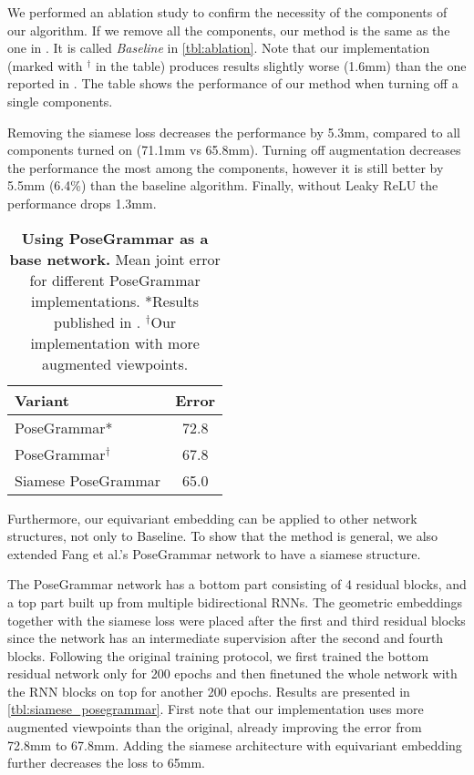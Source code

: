 \documentclass[preprint]{elsarticle}
\begin{document}
We performed an ablation study to confirm the necessity of the components of our algorithm. If we remove all the components, our method is the same as the one in \cite{3dbaseline}. It is called \textit{Baseline} in \autoref{tbl:ablation}. Note that our implementation (marked with $^\dagger$ in the table) produces results slightly worse (1.6mm) than the one reported in \cite{fang2018posegrammar}. The table shows the performance of our method when turning off a single components.

Removing the siamese loss decreases the performance by 5.3mm, compared to all components turned on (71.1mm vs 65.8mm). 
Turning off augmentation decreases the performance the most among the components, however it is still better by 5.5mm (6.4\%) than the baseline algorithm. Finally, without Leaky ReLU the performance drops 1.3mm.


\begin{table}[ht]
\centering
    \begin{tabular}[t]{lc}
    \hline
    Variant & Error \\
    \hline
    PoseGrammar* & 72.8 \\
    PoseGrammar$^\dagger$  & 67.8 \\
    Siamese PoseGrammar & 65.0  \\ 
    \hline
    \end{tabular}
    \caption{\textbf{Using PoseGrammar as a base network.} Mean joint error for different PoseGrammar implementations. *Results published in \cite{fang2018posegrammar}. $^\dagger$Our implementation with more augmented viewpoints. }
    \label{tbl:siamese_posegrammar}
\end{table}

Furthermore, our equivariant embedding can be applied to other network structures, not only to Baseline. To show that the method is general, we also extended Fang et al.'s PoseGrammar \cite{fang2018posegrammar} network to have a siamese structure. 

The PoseGrammar network has a bottom part consisting of 4 residual blocks, and a top part built up from multiple bidirectional RNNs. The geometric embeddings together with the siamese loss were placed after the first and third residual blocks since the network has an intermediate supervision after the second and fourth blocks. Following the original training protocol, we first trained the bottom residual network only for 200 epochs and then finetuned the whole network with the RNN blocks on top for another 200 epochs. Results are presented in  \autoref{tbl:siamese_posegrammar}. First note that our implementation uses more augmented viewpoints than the original, already improving the error from 72.8mm to 67.8mm. Adding the siamese architecture with equivariant embedding further decreases the loss to 65mm.
\end{document}

